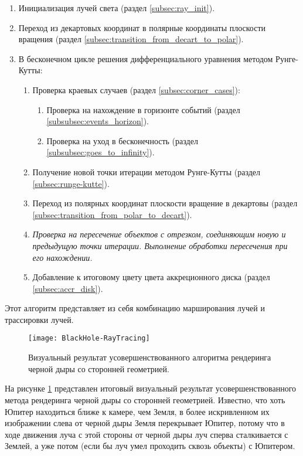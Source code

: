 \begin{enumerate}
    \item Инициализация лучей света (раздел \ref{subsec:ray_init}).
    \item Переход из декартовых координат в полярные координаты плоскости вращения (раздел \ref{subsec:transition_from_decart_to_polar}).
    \item В бесконечном цикле решения дифференциального уравнения методом Рунге-Кутты:
    \begin{enumerate}
        \item Проверка краевых случаев (раздел \ref{subsec:corner_cases}):
        \begin{enumerate}
            \item Проверка на нахождение в горизонте событий (раздел \ref{subsubsec:events_horizon}).
            \item Проверка на уход в бесконечность (раздел \ref{subsubsec:goes_to_infinity}).
        \end{enumerate}
        \item Получение новой точки итерации методом Рунге-Кутты (раздел \ref{subsec:runge-kutte}).
        \item Переход из полярных координат плоскости вращение в декартовы (раздел \ref{subsec:transition_from_polar_to_decart}).
        \item \textit{Проверка на пересечение объектов с отрезком, соединяющим новую и предыдущую точки итерации. Выполнение обработки пересечения при его нахождении.}
        \item Добавление к итоговому цвету цвета аккреционного диска (раздел \ref{subsec:accr_disk}).
    \end{enumerate}
\end{enumerate}

Этот алгоритм представляет из себя комбинацию марширования лучей и трассировки лучей.

\begin{figure}[h]
    \centering
    \texttt{[image: BlackHole-RayTracing]}
    \caption{Визуальный результат усовершенствованного алгоритма рендеринга черной дыры со сторонней геометрией.}
    \label{fig:blackhole_raytracing}
\end{figure}

На рисунке \ref{fig:blackhole_raytracing} представлен итоговый визуальный результат усовершенствованного метода рендеринга черной дыры со сторонней геометрией. Известно, что хоть Юпитер находиться ближе к камере, чем Земля, в более искривленном их изображении слева от черной дыры Земля перекрывает Юпитер, потому что в ходе движения луча с этой стороны от черной дыры луч сперва сталкивается с Землей, а уже потом (если бы луч умел проходить сквозь объекты) с Юпитером.

\newpage